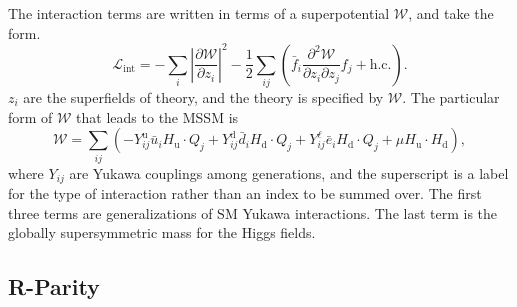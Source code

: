 The interaction terms are written in terms of a superpotential $\mathcal{W}$,
and take the form.
\begin{equation}
  \mathcal{L}_\mathrm{int} =
  - \sum_{i} \left| \frac{\partial \mathcal{W}}{\partial z_i} \right|^2
  - \frac{1}{2} \sum_{ij}
  \left( \bar{f}_i \frac{\partial^2 \mathcal{W}}{\partial z_i \partial z_j} f_j
  + \mathrm{h.c.} \right).
  \label{eqn:mssm_lagrange_int}
\end{equation}
$z_i$ are the superfields of theory, and the theory is specified by
$\mathcal{W}$.
The particular form of $\mathcal{W}$ that leads to the MSSM is 
\begin{equation}
  \mathcal{W} =
  \sum_{ij}
  \left(
    - Y_{ij}^\mathrm{u} \bar{u}_i H_\mathrm{u} \cdot Q_j
    + Y_{ij}^\mathrm{d} \bar{d}_i H_\mathrm{d} \cdot Q_j
    + Y_{ij}^{\ell}     \bar{e}_i H_\mathrm{d} \cdot Q_j
    + \mu H_\mathrm{u} \cdot H_\mathrm{d}
  \right),
\end{equation}
where $Y_{ij}$ are Yukawa couplings among generations, and the superscript is a
label for the type of interaction rather than an index to be summed over.
The first three terms are generalizations of SM Yukawa interactions.
The last term is the globally supersymmetric mass for the Higgs fields.

\FloatBarrier
\subsection{R-Parity}
\label{sec:r_parity}

